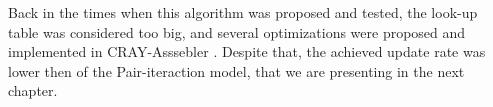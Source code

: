 Back in the times when this algorithm was proposed and tested, the look-up table was considered too big, and several optimizations were proposed and implemented in CRAY-Asssebler \cite{wolf}. Despite that, the achieved update rate was lower then of the Pair-iteraction model, that we are presenting in the next chapter. 

